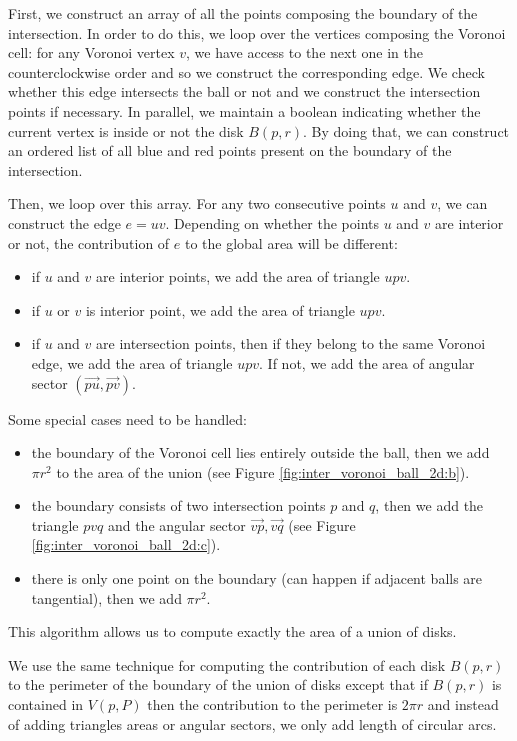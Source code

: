 First, we construct an array of all the points composing the boundary of the
intersection. In order to do this, we loop over the vertices composing the
Voronoi cell: for any Voronoi vertex $ v $, we have access to the next one in
the counterclockwise order and so we construct the corresponding edge. We check
whether this edge intersects the ball or not and we construct the intersection
points if necessary. In parallel, we maintain a boolean indicating whether the
current vertex is inside or not the disk $ B(p, r) $. By doing that, we can
construct an ordered list of all blue and red points present on the boundary
of the intersection.

Then, we loop over this array. For any two consecutive points $ u $ and $ v $,
we can construct the edge $ e = uv $. Depending on whether the points $ u $ and
$ v $ are interior or not, the contribution of $ e $ to the global area will be
different:
\begin{itemize}
    \item if $ u $ and $ v $ are interior points, we add the area of triangle $ upv $.
    \item if $ u $ or $ v $ is interior point, we add the area of triangle $ upv $.
    \item if $ u $ and $ v $ are intersection points, then if they belong to the
        same Voronoi edge, we add the area of triangle $ upv $. If not, we add the
        area of angular sector $ (\vec{pu}, \vec{pv}) $.
\end{itemize}

Some special cases need to be handled:
\begin{itemize}
    \item the boundary of the Voronoi cell lies entirely outside the ball, then
        we add $ \pi r^2 $ to the area of the union (see Figure
        \ref{fig:inter_voronoi_ball_2d:b}).
    \item the boundary consists of two intersection points $ p $ and $ q $, then
        we add the triangle $ pvq $ and the angular sector $ \vec{vp}, \vec{vq}
        $ (see Figure \ref{fig:inter_voronoi_ball_2d:c}).
    \item there is only one point on the boundary (can happen if adjacent balls
        are tangential), then we add $ \pi r^2 $.
\end{itemize}

This algorithm allows us to compute exactly the area of a union of disks.

We use the same technique for computing the contribution of each disk $ B(p, r)
$ to the perimeter of the boundary of the union of disks except that if $ B(p,
r) $ is contained in $ V(p, P) $ then the contribution to the perimeter is $ 2
\pi r $ and instead of adding triangles areas or angular sectors, we only add
length of circular arcs.

